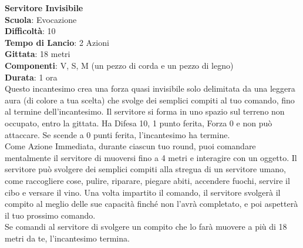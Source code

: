 \begin{multicols}{2}
\medskip\textbf{Servitore Invisibile}\\
\textbf{Scuola}: Evocazione\\
\textbf{Difficoltà}: 10\\
\textbf{Tempo di Lancio}: 2 Azioni\\
\textbf{Gittata}: 18 metri\\
\textbf{Componenti}: V, S, M (un pezzo di corda e un pezzo di legno)\\
\textbf{Durata}: 1 ora\\
Questo incantesimo crea una forza quasi invisibile solo delimitata da una leggera aura (di colore a tua scelta) che svolge dei semplici compiti al tuo comando, fino al termine dell'incantesimo. Il servitore si forma in uno spazio sul terreno non occupato, entro la gittata. Ha Difesa 10, 1 punto ferita, Forza 0 e non può attaccare. Se scende a 0 punti ferita, l'incantesimo ha termine.\\
Come Azione Immediata, durante ciascun tuo round, puoi comandare mentalmente il servitore di muoversi fino a 4 metri e interagire con un oggetto. Il servitore può svolgere dei semplici compiti alla stregua di un servitore umano, come raccogliere cose, pulire, riparare, piegare abiti, accendere fuochi, servire il cibo e versare il vino. Una volta impartito il comando, il servitore svolgerà il compito al meglio delle sue capacità finché non l'avrà completato, e poi aspetterà il tuo prossimo comando. \\
Se comandi al servitore di svolgere un compito che lo farà muovere a più di 18 metri da te, l'incantesimo termina.


\end{multicols}
